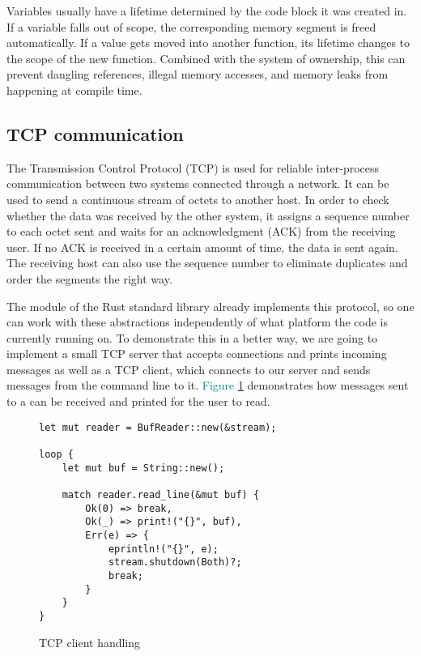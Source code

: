 Variables usually have a lifetime determined by the code block it was created in. If a variable falls out of scope, the
corresponding memory segment is freed automatically. If a value gets moved into another function, its lifetime changes
to the scope of the new function. Combined with the system of ownership, this can prevent dangling references, illegal
memory accesses, and memory leaks from happening at compile time. \cite{c15safe}

\subsection{TCP communication}
The Transmission Control Protocol (TCP) is used for reliable inter-process communication between two systems connected
through a network. It can be used to send a continuous stream of octets to another host. In order to check whether the
data was received by the other system, it assigns a sequence number to each octet sent and waits for an acknowledgment
(ACK) from the receiving user. If no ACK is received in a certain amount of time, the data is sent again. The receiving
host can also use the sequence number to eliminate duplicates and order the segments the right way. \cite{RFC0793}

The module  of the Rust standard library already implements this protocol, so one can work with these
abstractions independently of what platform the code is currently running on. To demonstrate this in a better way, we
are going to implement a small TCP server that accepts connections and prints incoming messages as well as a TCP
client, which connects to our server and sends messages from the command line to it.
\textcolor{teal}{Figure \ref{tcp-client-handling}} demonstrates how messages sent to a  can
be received and printed for the user to read.

\begin{figure}[ht]
    \begin{verbatim}
let mut reader = BufReader::new(&stream);

loop {
    let mut buf = String::new();

    match reader.read_line(&mut buf) {
        Ok(0) => break,
        Ok(_) => print!("{}", buf),
        Err(e) => {
            eprintln!("{}", e);
            stream.shutdown(Both)?;
            break;
        }
    }
}
    \end{verbatim}
    \caption{TCP client handling}
    \label{tcp-client-handling}
\end{figure}

